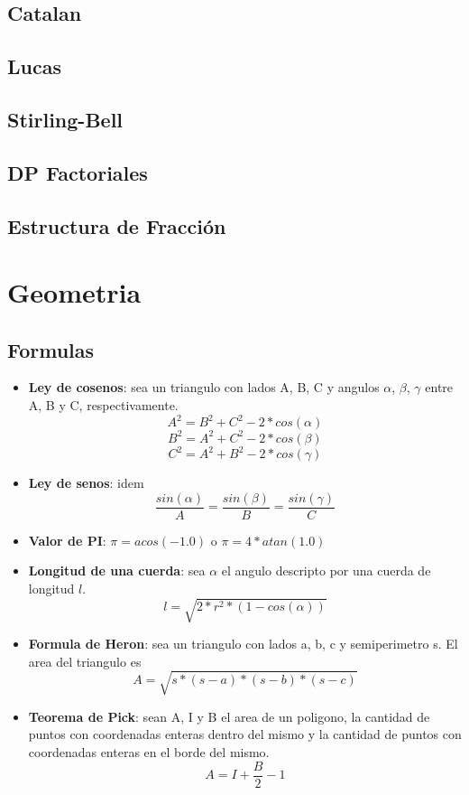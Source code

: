 \documentclass[a4paper,11pt,landscape,twocolumn]{article}
\begin{document}
\subsection{Catalan}



\subsection{Lucas}



\subsection{Stirling-Bell}



\subsection{DP Factoriales}



\subsection{Estructura de Fracción}



\section{Geometria}

\subsection{Formulas}

\begin{itemize}
  \item \textbf{Ley de cosenos}: sea un triangulo con lados A, B, C y angulos $\alpha$, $\beta$, $\gamma$ entre A, B y C, respectivamente.
  $$A^2=B^2+C^2-2*cos(\alpha)$$
  $$B^2=A^2+C^2-2*cos(\beta)$$
  $$C^2=A^2+B^2-2*cos(\gamma)$$
  \item \textbf{Ley de senos}: idem
  $$\frac{sin(\alpha)}{A}=\frac{sin(\beta)}{B}=\frac{sin(\gamma)}{C}$$
  \item \textbf{Valor de PI}: $\pi=acos(-1.0)$ o $\pi=4*atan(1.0)$
  \item \textbf{Longitud de una cuerda}: sea $\alpha$ el angulo descripto por una cuerda de longitud $l$.
  $$l=\sqrt{2*r^2*(1-cos(\alpha))}$$
  \item \textbf{Formula de Heron}: sea un triangulo con lados a, b, c y semiperimetro s. El area del triangulo es
  $$A=\sqrt{s*(s-a)*(s-b)*(s-c)}$$
  \item \textbf{Teorema de Pick}: sean A, I y B el area de un poligono, la cantidad de puntos con coordenadas enteras dentro del mismo y la cantidad de puntos con coordenadas enteras en el borde del mismo.
  $$A=I+\frac{B}{2}-1$$
\end{itemize}
\end{document}
